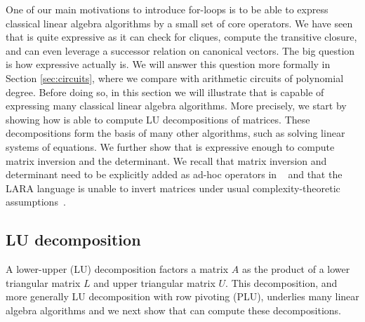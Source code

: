 
One of our main motivations to introduce for-loops is to be able to express classical linear algebra algorithms by a small set of core operators. We have seen that \langfor is
quite expressive as it can check for cliques, compute the transitive closure, and can even
leverage a successor relation on canonical vectors. The big question is how expressive \langfor
actually is. We will answer this question more formally in Section \ref{sec:circuits}, where we compare \langfor with 
arithmetic circuits of polynomial degree.
Before doing so, in this section we will illustrate that \langfor is capable of expressing many classical linear algebra algorithms. More precisely, we start by showing how  \langfor is able to
compute LU decompositions of matrices. These decompositions form the basis of many other algorithms, such as solving linear systems of equations. We further show that \langfor is expressive enough to compute matrix inversion and the determinant. We recall that matrix inversion and determinant need to be explicitly added as ad-hoc operators in \lang~\cite{matlang-journal} and that the LARA language is unable to invert matrices under usual complexity-theoretic assumptions~\cite{BarceloH0S20}.


\subsection{LU decomposition}
A lower-upper (LU) decomposition factors a matrix $A$ as the product of a lower triangular matrix $L$ and upper triangular matrix $U$.  
This decomposition, and more generally LU decomposition with row pivoting (PLU),  underlies many linear algebra algorithms and 
we next show that \langfor can compute these decompositions.

